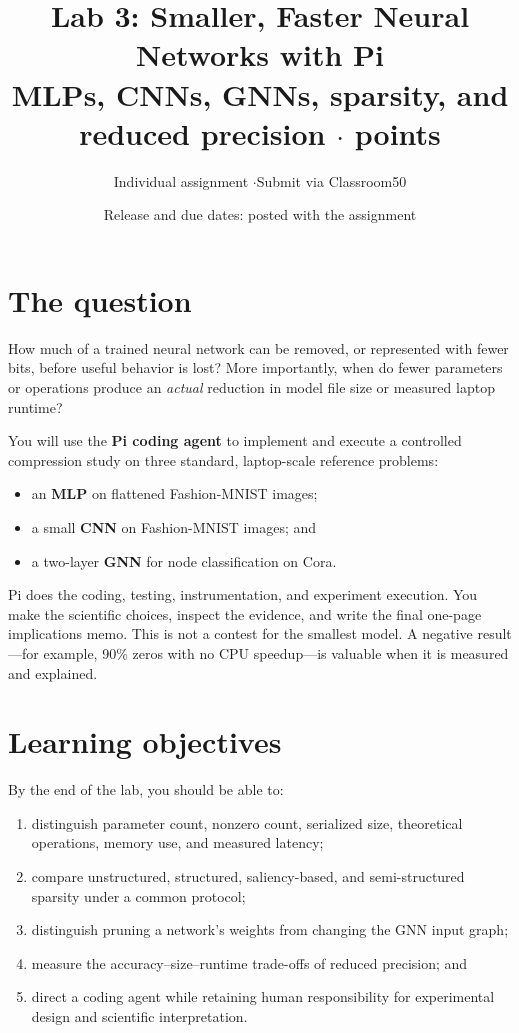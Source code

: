 \documentclass[11pt,letterpaper]{article}
\title{\vspace{-2em}\textbf{Lab 3: Smaller, Faster Neural Networks with Pi}\\[0.25em]
\large MLPs, CNNs, GNNs, sparsity, and reduced precision \quad$\cdot$\quad 100 points}
\author{Individual assignment \quad$\cdot$\quad Submit via Classroom50}
\date{Release and due dates: posted with the assignment}
\begin{document}
\maketitle\thispagestyle{fancy}

\section*{The question}
How much of a trained neural network can be removed, or represented with fewer bits, before useful behavior is lost? More importantly, when do fewer parameters or operations produce an \emph{actual} reduction in model file size or measured laptop runtime?

You will use the \textbf{Pi coding agent} to implement and execute a controlled compression study on three standard, laptop-scale reference problems:
\begin{itemize}
 \item an \textbf{MLP} on flattened Fashion-MNIST images;
 \item a small \textbf{CNN} on Fashion-MNIST images; and
 \item a two-layer \textbf{GNN} for node classification on Cora.
\end{itemize}
Pi does the coding, testing, instrumentation, and experiment execution. You make the scientific choices, inspect the evidence, and write the final one-page implications memo. This is not a contest for the smallest model. A negative result---for example, 90\% zeros with no CPU speedup---is valuable when it is measured and explained.

\section*{Learning objectives}
By the end of the lab, you should be able to:
\begin{enumerate}
 \item distinguish parameter count, nonzero count, serialized size, theoretical operations, memory use, and measured latency;
 \item compare unstructured, structured, saliency-based, and semi-structured sparsity under a common protocol;
 \item distinguish pruning a network's weights from changing the GNN input graph;
 \item measure the accuracy--size--runtime trade-offs of reduced precision; and
 \item direct a coding agent while retaining human responsibility for experimental design and scientific interpretation.
\end{enumerate}
\end{document}
